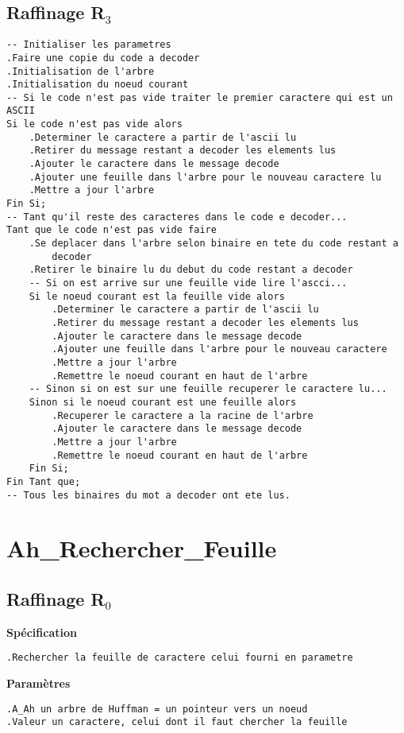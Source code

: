 \documentclass{book}
\begin{document}
\subsection{Raffinage R$_{3}$}
\begin{lstlisting}[frame=single]
-- Initialiser les parametres
.Faire une copie du code a decoder
.Initialisation de l'arbre
.Initialisation du noeud courant
-- Si le code n'est pas vide traiter le premier caractere qui est un ASCII
Si le code n'est pas vide alors
	.Determiner le caractere a partir de l'ascii lu
	.Retirer du message restant a decoder les elements lus
	.Ajouter le caractere dans le message decode
	.Ajouter une feuille dans l'arbre pour le nouveau caractere lu
	.Mettre a jour l'arbre
Fin Si;
-- Tant qu'il reste des caracteres dans le code e decoder...
Tant que le code n'est pas vide faire
	.Se deplacer dans l'arbre selon binaire en tete du code restant a
		decoder
	.Retirer le binaire lu du debut du code restant a decoder
	-- Si on est arrive sur une feuille vide lire l'ascci...
	Si le noeud courant est la feuille vide alors
		.Determiner le caractere a partir de l'ascii lu
		.Retirer du message restant a decoder les elements lus
		.Ajouter le caractere dans le message decode
		.Ajouter une feuille dans l'arbre pour le nouveau caractere
		.Mettre a jour l'arbre
		.Remettre le noeud courant en haut de l'arbre
	-- Sinon si on est sur une feuille recuperer le caractere lu...
	Sinon si le noeud courant est une feuille alors
		.Recuperer le caractere a la racine de l'arbre
		.Ajouter le caractere dans le message decode
		.Mettre a jour l'arbre
		.Remettre le noeud courant en haut de l'arbre
	Fin Si;
Fin Tant que;
-- Tous les binaires du mot a decoder ont ete lus.
\end{lstlisting}

\section{Ah\_Rechercher\_Feuille}

\subsection{Raffinage R$_{0}$}
\textbf{Spécification}
\begin{lstlisting}[frame=single]
.Rechercher la feuille de caractere celui fourni en parametre
\end{lstlisting}
\textbf{Paramètres}
\begin{lstlisting}[frame=single]
.A_Ah un arbre de Huffman = un pointeur vers un noeud
.Valeur un caractere, celui dont il faut chercher la feuille
\end{lstlisting}
\end{document}
